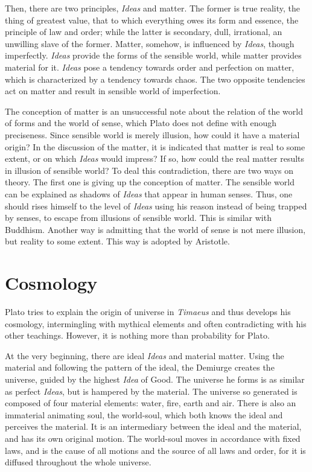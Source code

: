 \documentclass[11pt]{article}
\begin{document}
\begin{sloppypar}
\newline

Then, there are two principles, \textit{Ideas} and matter. 
The former is true reality, the thing of greatest value, that to which everything owes its form and essence, the principle of law and order; 
while the latter is secondary, dull, irrational, an unwilling slave of the former. 
Matter, somehow, is influenced by \textit{Ideas}, though imperfectly. 
\textit{Ideas} provide the forms of the sensible world, while matter provides material for it. 
\textit{Ideas} pose a tendency towards order and perfection on matter, which is characterized by a tendency towards chaos. 
The two opposite tendencies act on matter and result in sensible world of imperfection.

\newline

The conception of matter is an unsuccessful note about the relation of the world of forms and the world of sense, which Plato does not define with enough preciseness. 
Since sensible world is merely illusion, how could it have a material origin? 
In the discussion of the matter, it is indicated that matter is real to some extent, or on which \textit{Ideas} would impress? 
If so, how could the real matter results in illusion of sensible world? 
To deal this contradiction, there are two ways on theory. 
The first one is giving up the conception of matter. 
The sensible world can be explained as shadows of \textit{Ideas} that appear in human senses. 
Thus, one should rises himself to the level of \textit{Ideas} using his reason instead of being trapped by senses, to escape from illusions of sensible world. 
This is similar with Buddhism. 
Another way is admitting that the world of sense is not mere illusion, but reality to some extent. 
This way is adopted by Aristotle.
  
\section{Cosmology} 
Plato tries to explain the origin of universe in \textit{Timaeus} and thus develops his cosmology, intermingling with mythical elements and often contradicting with his other teachings. 
However, it is nothing more than probability for Plato. 

\newline

At the very beginning, there are ideal \textit{Ideas} and material matter. 
Using the material and following the pattern of the ideal, the Demiurge creates the universe, guided by the highest \textit{Idea} of Good. 
The universe he forms is as similar as perfect \textit{Ideas}, but is hampered by the material. 
The universe so generated is composed of four material elements: 
water, fire, earth and air. 
There is also an immaterial animating soul, the world-soul, which both knows the ideal and perceives the material. 
It is an intermediary between the ideal and the material, and has its own original motion. 
The world-soul moves in accordance with fixed laws, and is the cause of all motions and the source of all laws and order, for it is diffused throughout the whole universe.


\end{sloppypar}
\end{document}
